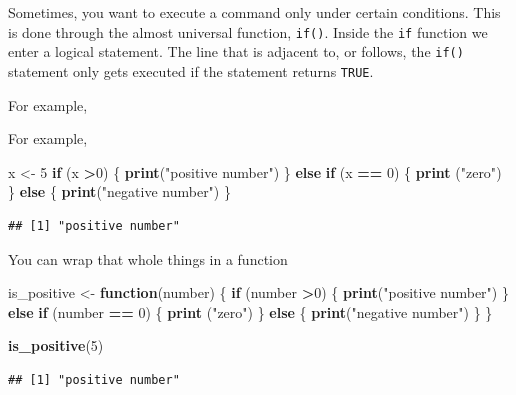 \documentclass[]{book}
\newenvironment{Shaded}{\begin{snugshade}}{\end{snugshade}}
\newcommand{\KeywordTok}[1]{\textcolor[rgb]{0.13,0.29,0.53}{\textbf{#1}}}
\newcommand{\DecValTok}[1]{\textcolor[rgb]{0.00,0.00,0.81}{#1}}
\newcommand{\StringTok}[1]{\textcolor[rgb]{0.31,0.60,0.02}{#1}}
\newcommand{\ControlFlowTok}[1]{\textcolor[rgb]{0.13,0.29,0.53}{\textbf{#1}}}
\newcommand{\OperatorTok}[1]{\textcolor[rgb]{0.81,0.36,0.00}{\textbf{#1}}}
\newcommand{\NormalTok}[1]{#1}
\theoremstyle{definition}
\theoremstyle{definition}
\theoremstyle{definition}
\theoremstyle{remark}
\begin{document}
Sometimes, you want to execute a command only under certain conditions.
This is done through the almost universal function, \texttt{if()}.
Inside the \texttt{if} function we enter a logical statement. The line
that is adjacent to, or follows, the \texttt{if()} statement only gets
executed if the statement returns \texttt{TRUE}.

For example,

For example,

\begin{Shaded}
\begin{Highlighting}[]
\NormalTok{x <-}\StringTok{ }\DecValTok{5}
\ControlFlowTok{if}\NormalTok{ (x }\OperatorTok{>}\DecValTok{0}\NormalTok{) \{}
  \KeywordTok{print}\NormalTok{(}\StringTok{"positive number"}\NormalTok{)}
\NormalTok{\} }\ControlFlowTok{else} \ControlFlowTok{if}\NormalTok{ (x }\OperatorTok{==}\StringTok{ }\DecValTok{0}\NormalTok{)  \{}
  \KeywordTok{print}\NormalTok{ (}\StringTok{"zero"}\NormalTok{)}
\NormalTok{\} }\ControlFlowTok{else}\NormalTok{ \{}
  \KeywordTok{print}\NormalTok{(}\StringTok{"negative number"}\NormalTok{)}
\NormalTok{\}}
\end{Highlighting}
\end{Shaded}

\begin{verbatim}
## [1] "positive number"
\end{verbatim}

You can wrap that whole things in a function

\begin{Shaded}
\begin{Highlighting}[]
\NormalTok{is_positive <-}\StringTok{ }\ControlFlowTok{function}\NormalTok{(number) \{}
  \ControlFlowTok{if}\NormalTok{ (number }\OperatorTok{>}\DecValTok{0}\NormalTok{) \{}
    \KeywordTok{print}\NormalTok{(}\StringTok{"positive number"}\NormalTok{)}
\NormalTok{  \} }\ControlFlowTok{else} \ControlFlowTok{if}\NormalTok{ (number }\OperatorTok{==}\StringTok{ }\DecValTok{0}\NormalTok{)  \{}
    \KeywordTok{print}\NormalTok{ (}\StringTok{"zero"}\NormalTok{)}
\NormalTok{  \} }\ControlFlowTok{else}\NormalTok{ \{}
    \KeywordTok{print}\NormalTok{(}\StringTok{"negative number"}\NormalTok{)}
\NormalTok{  \}}
\NormalTok{\}}

\KeywordTok{is_positive}\NormalTok{(}\DecValTok{5}\NormalTok{)}
\end{Highlighting}
\end{Shaded}

\begin{verbatim}
## [1] "positive number"
\end{verbatim}
\end{document}
